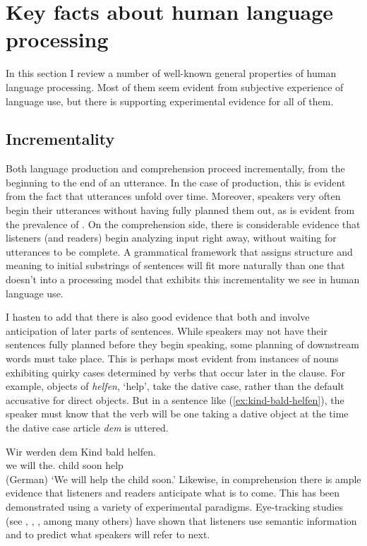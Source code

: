 \documentclass[output=paper
 	        ,biblatex
                ,babelshorthands
                ,newtxmath
                ,draftmode
                ,colorlinks, citecolor=brown
]{langscibook}
\begin{document}
\section{Key facts about human language processing}
\label{sec-key-facts}

In this section I review a number of well-known general properties of human language processing.  Most of them seem evident from subjective experience of language use, but there is supporting experimental evidence for all of them.  

\subsection{Incrementality}
\label{processing:incrementality}

\largerpage\enlargethispage{3pt}
Both language production and comprehension proceed incrementally, from the beginning to the end of
an utterance.  In the case of production, this is evident from the fact that utterances unfold over
time.  Moreover, speakers very often begin their utterances without having fully planned them out,
as is evident from the prevalence of .  On the comprehension side, there is
considerable evidence that listeners (and readers) begin analyzing input right away, without waiting
for utterances to be complete.  A grammatical framework that assigns structure and meaning to
initial substrings of sentences will fit more naturally than one that doesn't into a processing
model that exhibits this incrementality we see in human language use.

I hasten to add that there is also good evidence that both  and 
involve anticipation of later parts of sentences.  While speakers may not have their sentences fully
planned before they begin speaking, some planning of downstream words must take place.  This is
perhaps most evident from instances of nouns exhibiting quirky cases determined by verbs that occur
later in the clause.  For example, objects of  \emph{helfen}, `help', take the dative
case, rather than the default accusative for direct objects.  But in a sentence like
(\ref{ex:kind-bald-helfen}), the speaker must know that the verb will be one taking a dative object
at the time the dative case article \emph{dem} is uttered.

\ea\label{ex:kind-bald-helfen}
\gll Wir werden dem        Kind bald helfen.\\
     we will    the.\DAT{} child soon help\\\hfill (German)
\glt `We will help the child soon.'
\z
Likewise, in comprehension there is ample evidence that listeners and readers anticipate what is to
come.  This has been demonstrated using a variety of experimental paradigms.  Eye-tracking
studies (see \citealt{TanenhausEtal1995}, \citealt{AltmannKamide99}, \citealt{ArnoldEtal2007}, among
many others) have shown that listeners use semantic information and  to predict
what speakers will refer to next. 
\end{document}
